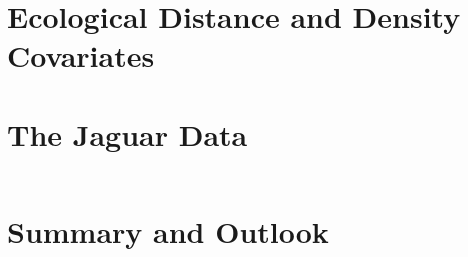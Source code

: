 \begin{table}
\centering
\begin{tabular}{lrlrrrr}
\hline
\hline
\hline
\end{tabular}
\label{state-space.tab.jagsVsecr}
\end{table}


\section{Ecological Distance and Density Covariates}

\begin{figure}[ht]
\centering
\label{ch9.fig.sim}
\end{figure}


\section{The Jaguar Data}

\begin{figure}
\centering
\label{state-space.fig.jaguarCts}
\end{figure}

\begin{table}
\centering
\begin{tabular}{lrrrr}
\hline
\hline
 \hline
\end{tabular}
\label{state-space.tab.jagposts}
\end{table}

\begin{figure}
\centering
\label{state-space.fig.Dsurface}
\end{figure}


\section{Summary and Outlook}
